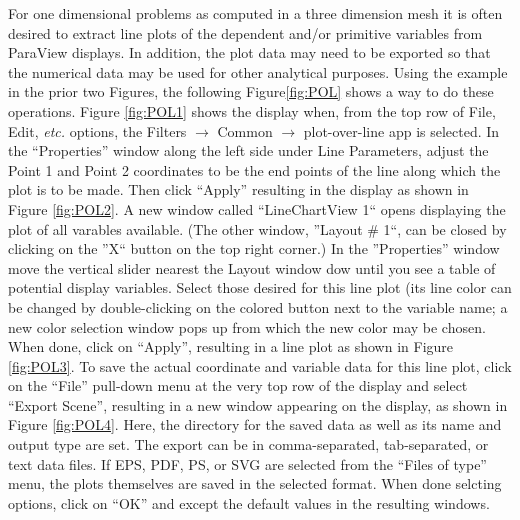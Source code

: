 \begin{appendices}
For one dimensional problems as computed in a three dimension mesh it is often desired to extract line plots of the dependent and/or primitive variables from ParaView displays.  In addition, the plot data may need to be exported so that the numerical data may be used for other analytical purposes.  Using the example in the prior two Figures, the following Figure\ref{fig:POL} shows a way to do these operations. Figure \ref{fig:POL1} shows the display when, from the top row of File, Edit, \textit{etc.} options, the Filters $\rightarrow$ Common $\rightarrow$ plot-over-line app is selected.  In the  ``Properties'' window along the left side under Line Parameters, adjust the Point 1 and Point 2 coordinates to be the end points of the line along which the plot is to be made.  Then click ``Apply'' resulting in the display as shown in Figure \ref{fig:POL2}. A new window called ``LineChartView 1`` opens displaying the plot of all varables available.  (The other window, ''Layout \# 1``, can be closed by clicking on the ''X`` button on the top right corner.) In the ''Properties'' window move the vertical slider nearest the Layout window dow until you see a table of potential display variables.  Select those desired for this line plot (its line color can be changed by double-clicking on the colored button next to the variable name; a new color selection window pops up from which the new color may be chosen.  When done, click on ``Apply'', resulting in a line plot as shown in Figure \ref{fig:POL3}.  To save the actual coordinate and variable data for this line plot, click on the ``File'' pull-down menu at the very top row of the display and select ``Export Scene'', resulting in a new window appearing on the display, as shown in Figure \ref{fig:POL4}.  Here, the directory for the saved data as well as its name and output type are set.  The export can be in comma-separated, tab-separated, or text data files.  If EPS, PDF, PS, or SVG are selected from the ``Files of type'' menu, the plots themselves are saved in the selected format.  When done selcting options, click on ``OK'' and except the default values in the resulting windows.


\end{appendices}
